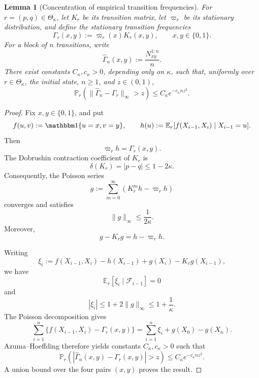 \documentclass[12pt]{article}
\theoremstyle{spaced}
\newtheorem{lemma}[lemma]{Lemma}
\theoremstyle{remark}
\begin{document}
\begin{lemma}[Concentration of empirical transition frequencies]
\label{lem:markov-transition-concentration}
For \(r=(p,q)\in\Theta_\kappa\), let \(K_r\) be its transition
matrix, let \(\varpi_r\) be its stationary distribution, and define
the stationary transition frequencies
\[
    \Gamma_r(x,y)
    :=
    \varpi_r(x)K_r(x,y),
    \qquad x,y\in\{0,1\}.
\]
For a block of \(n\) transitions, write
\[
    \widehat\Gamma_n(x,y)
    :=
    \frac{N_{xy}^{1:n}}{n}.
\]
There exist constants \(C_\kappa,c_\kappa>0\), depending only on
\(\kappa\), such that, uniformly over \(r\in\Theta_\kappa\), the
initial state, \(n\ge1\), and \(z\in(0,1)\),
\[
    \mathbb P_r
    \left(
        \|\widehat\Gamma_n-\Gamma_r\|_\infty>z
    \right)
    \le
    C_\kappa e^{-c_\kappa nz^2}.
\]
\end{lemma}

\begin{proof}
Fix \(x,y\in\{0,1\}\), and put
\[
    f(u,v):=\mathbbm 1\{u=x,v=y\},
    \qquad
    h(u):=\mathbb E_r[f(X_{i-1},X_i)\mid X_{i-1}=u].
\]
Then
\[
    \varpi_r h=\Gamma_r(x,y).
\]
The Dobrushin contraction coefficient of \(K_r\) is
\[
    \delta(K_r)=|p-q|\le1-2\kappa.
\]
Consequently, the Poisson series
\[
    g
    :=
    \sum_{m=0}^\infty
    \left(
        K_r^m h-\varpi_r h
    \right)
\]
converges and satisfies
\[
    \|g\|_\infty\le\frac{1}{2\kappa}.
\]
Moreover,
\[
    g-K_rg=h-\varpi_rh.
\]

Writing
\[
    \xi_i
    :=
    f(X_{i-1},X_i)-h(X_{i-1})
    +g(X_i)-K_rg(X_{i-1}),
\]
we have
\[
    \mathbb E_r[\xi_i\mid\mathcal F_{i-1}]=0
\]
and
\[
    |\xi_i|
    \le
    1+2\|g\|_\infty
    \le
    1+\frac1\kappa.
\]
The Poisson decomposition gives
\[
    \sum_{i=1}^n
    \{f(X_{i-1},X_i)-\Gamma_r(x,y)\}
    =
    \sum_{i=1}^n\xi_i+g(X_0)-g(X_n).
\]
Azuma--Hoeffding therefore yields constants \(C_\kappa,c_\kappa>0\)
such that
\[
    \mathbb P_r
    \left(
        \left|
            \widehat\Gamma_n(x,y)-\Gamma_r(x,y)
        \right|>z
    \right)
    \le
    C_\kappa e^{-c_\kappa nz^2}.
\]
A union bound over the four pairs \((x,y)\) proves the result.
\end{proof}
\end{document}
